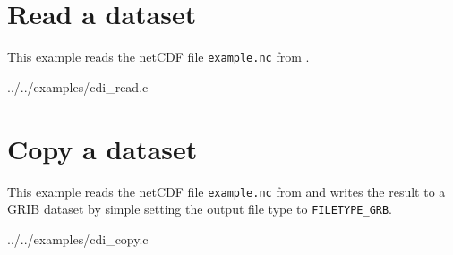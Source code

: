 \section{Read a dataset}

This example reads the netCDF file {\tt example.nc} from .


{../../examples/cdi_read.c}


\section{Copy a dataset}

This example reads the netCDF file {\tt example.nc} from 
and writes the result to a GRIB dataset by simple setting the output file type
to {\tt FILETYPE\_GRB}.


{../../examples/cdi_copy.c}
